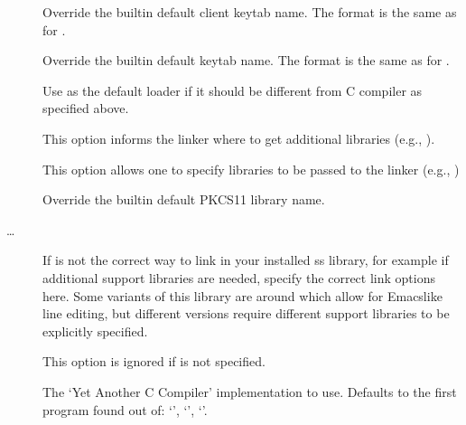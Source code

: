 \documentclass[letterpaper,10pt,english]{sphinxmanual}
\begin{document}
\begin{description}
\item[{}] \leavevmode
\sphinxAtStartPar
Override the built\sphinxhyphen{}in default client keytab name.
The format is the same as for .

\item[{}] \leavevmode
\sphinxAtStartPar
Override the built\sphinxhyphen{}in default keytab name.
The format is the same as for .

\item[{}] \leavevmode
\sphinxAtStartPar
Use  as the default loader if it should be different from
C compiler as specified above.

\item[{}] \leavevmode
\sphinxAtStartPar
This option informs the linker where to get additional libraries
(e.g., ).

\item[{}] \leavevmode
\sphinxAtStartPar
This option allows one to specify libraries to be passed to the
linker (e.g., )

\item[{}] \leavevmode
\sphinxAtStartPar
Override the built\sphinxhyphen{}in default PKCS11 library name.

\item[{…}] \leavevmode
\sphinxAtStartPar
If  is not the correct way to link in your installed ss
library, for example if additional support libraries are needed,
specify the correct link options here.  Some variants of this
library are around which allow for Emacs\sphinxhyphen{}like line editing, but
different versions require different support libraries to be
explicitly specified.

\sphinxAtStartPar
This option is ignored if \sphinxstylestrong{\sphinxhyphen{}} is not specified.

\item[{}] \leavevmode
\sphinxAtStartPar
The ‘Yet Another C Compiler’ implementation to use. Defaults to
the first program found out of: ‘’, ‘’,
‘’.


\end{description}
\end{document}
